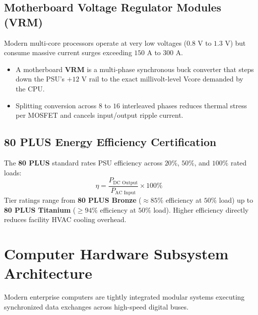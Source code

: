 \subsection{Motherboard Voltage Regulator Modules (VRM)}
Modern multi-core processors operate at very low voltages ($0.8\text{ V}$ to $1.3\text{ V}$) but consume massive current surges exceeding $150\text{ A}$ to $300\text{ A}$.
\begin{itemize}
    \item A motherboard \textbf{VRM} is a multi-phase synchronous buck converter that steps down the PSU's $+12\text{ V}$ rail to the exact millivolt-level Vcore demanded by the CPU.
    \item Splitting conversion across $8$ to $16$ interleaved phases reduces thermal stress per MOSFET and cancels input/output ripple current.
\end{itemize}

\subsection{80 PLUS Energy Efficiency Certification}
The \textbf{80 PLUS} standard rates PSU efficiency across $20\%$, $50\%$, and $100\%$ rated loads:
\begin{equation}
\label{eq:psu_efficiency}
\boxed{\eta = \frac{P_{\text{DC Output}}}{P_{\text{AC Input}}} \times 100\%}
\end{equation}
Tier ratings range from \textbf{80 PLUS Bronze} ($\approx 85\%$ efficiency at $50\%$ load) up to \textbf{80 PLUS Titanium} ($\ge 94\%$ efficiency at $50\%$ load). Higher efficiency directly reduces facility HVAC cooling overhead.

\section{Computer Hardware Subsystem Architecture}
\label{sec:hardware_architecture}

Modern enterprise computers are tightly integrated modular systems executing synchronized data exchanges across high-speed digital buses.

